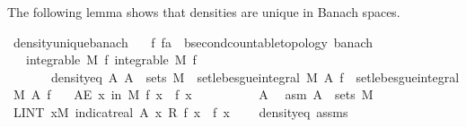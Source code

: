 \begin{isabellebody}
\begin{isamarkuptext}
The following lemma shows that densities are unique in Banach spaces.%
\end{isamarkuptext}\isamarkuptrue%
\isamarkupfalse%
\ density{\isacharunderscore}{\kern0pt}unique{\isacharunderscore}{\kern0pt}banach{\isacharcolon}{\kern0pt}\isanewline
\ \ \ f\ f{\isacharprime}{\kern0pt}{\isacharcolon}{\kern0pt}{\isacharcolon}{\kern0pt}{\isachardoublequoteopen}{\isacharprime}{\kern0pt}a\ {\isasymRightarrow}\ {\isacharprime}{\kern0pt}b{\isacharcolon}{\kern0pt}{\isacharcolon}{\kern0pt}{\isacharbraceleft}{\kern0pt}second{\isacharunderscore}{\kern0pt}countable{\isacharunderscore}{\kern0pt}topology{\isacharcomma}{\kern0pt}\ banach{\isacharbraceright}{\kern0pt}{\isachardoublequoteclose}\isanewline
\ \ \ {\isachardoublequoteopen}integrable\ M\ f{\isachardoublequoteclose}\ {\isachardoublequoteopen}integrable\ M\ f{\isacharprime}{\kern0pt}{\isachardoublequoteclose}\isanewline
\ \ \ \ \ \ \ density{\isacharunderscore}{\kern0pt}eq{\isacharcolon}{\kern0pt}\ {\isachardoublequoteopen}{\isasymAnd}A{\isachardot}{\kern0pt}\ A\ {\isasymin}\ sets\ M\ {\isasymLongrightarrow}\ set{\isacharunderscore}{\kern0pt}lebesgue{\isacharunderscore}{\kern0pt}integral\ M\ A\ f\ {\isacharequal}{\kern0pt}\ set{\isacharunderscore}{\kern0pt}lebesgue{\isacharunderscore}{\kern0pt}integral\ M\ A\ f{\isacharprime}{\kern0pt}{\isachardoublequoteclose}\isanewline
\ \ \ {\isachardoublequoteopen}AE\ x\ in\ M{\isachardot}{\kern0pt}\ f\ x\ {\isacharequal}{\kern0pt}\ f{\isacharprime}{\kern0pt}\ x{\isachardoublequoteclose}\isanewline
%
\isadelimproof
%
\endisadelimproof
%
\isatagproof
{}\isamarkupfalse%
{\isacharminus}{\kern0pt}\isanewline
\ \ \isacommand{{\isacharbraceleft}{\kern0pt}}\isamarkupfalse%
\ \isanewline
\ \ \ \ \isamarkupfalse%
\ A\ \isamarkupfalse%
\ asm{\isacharcolon}{\kern0pt}\ {\isachardoublequoteopen}A\ {\isasymin}\ sets\ M{\isachardoublequoteclose}\isanewline
\ \ \ \ \isamarkupfalse%
\ {\isachardoublequoteopen}LINT\ x{\isacharbar}{\kern0pt}M{\isachardot}{\kern0pt}\ indicat{\isacharunderscore}{\kern0pt}real\ A\ x\ {\isacharasterisk}{\kern0pt}\isactrlsub R\ {\isacharparenleft}{\kern0pt}f\ x\ {\isacharminus}{\kern0pt}\ f{\isacharprime}{\kern0pt}\ x{\isacharparenright}{\kern0pt}\ {\isacharequal}{\kern0pt}\ {}{\isachardoublequoteclose}\ \isamarkupfalse%
\ density{\isacharunderscore}{\kern0pt}eq\ assms{\isacharparenleft}{\kern0pt}{}{\isacharcomma}{\kern0pt}{}{\isacharparenright}{\kern0pt}\ \isamarkupfalse%

\end{isabellebody}
